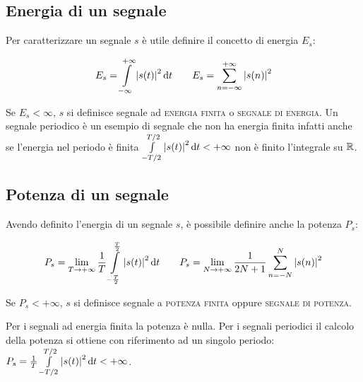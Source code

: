 \subsection{Energia di un segnale}
Per caratterizzare un segnale $s$ \`e utile definire il concetto di energia $E_s$:

\begin{equation}\label{eq:segnale_energia}
E_s=\int\limits_{-\infty}^{+\infty}{\left|{s(t)}\right|^2}{\,\mathop{}\!\mathrm{d}{t}} \qquad E_s=\sum_{n=-\infty}^{+\infty}\left|{s(n)}\right|^2
\end{equation}

Se $E_s < \infty$, $s$  si definisce segnale ad \textsc{energia finita} o \textsc{segnale di energia}.
Un segnale periodico è un esempio di segnale che non ha energia finita infatti anche se l'energia nel periodo è finita $\int\limits_{-T/2}^{T/2}{\left|{s(t)}\right|^2}{\,\mathop{}\!\mathrm{d}{t}}<+\infty$ non è finito l'integrale su $\mathbb{R}$.

\subsection{Potenza di un segnale}
Avendo definito l'energia di un segnale $s$, \`e possibile definire anche la potenza $P_s$:

\begin{equation}\label{eq:segnale_potenza}
P_s=\lim\limits_{T\to+\infty}{\frac{1}{T}\int\limits_{-\frac{T}{2}}^{\frac{T}{2}}{\left|{s(t)}\right|^2}{\,\mathop{}\!\mathrm{d}{t}}}   \qquad  P_s=\lim\limits_{N\to+\infty}{\frac{1}{2N+1}\sum_{n=-N}^{N}{\left|{s(n)}\right|^2}}
\end{equation}

Se $P_s<+\infty$, $s$ si definisce segnale a \textsc{potenza finita} oppure \textsc{segnale di potenza}.

Per i segnali ad energia finita la potenza è nulla. Per i segnali periodici il calcolo della potenza si ottiene con riferimento ad un singolo periodo: $P_s=\frac{1}{T}\int\limits_{-T/2}^{T/2}{\left|{s(t)}\right|^2}{\,\mathop{}\!\mathrm{d}{t}}<+\infty$.

